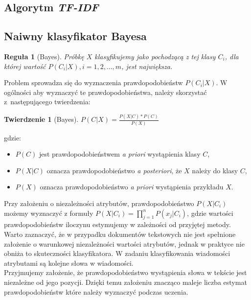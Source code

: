 \documentclass[a4paper,12pt]{article}
\newtheorem{rg}{Reguła}
\newtheorem{twr}{Twierdzenie}
\begin{document}
\subsection{Algorytm \textit{TF-IDF}}

\subsection{Naiwny klasyfikator Bayesa}
 
\begin{rg}[Bayes]
Próbkę $X$ klasyfikujemy jako pochodzącą z tej klasy $C_i$, dla której wartość $P(C_i|X), i = 1, 2, \dots, m$, jest największa.
\end{rg}
 
Problem sprowadza się do wyznaczenia prawdopodobieństw $P(C_i|X)$.
W ogólności aby wyznaczyć te prawdopodobieństwa, należy skorzystać z~następującego twierdzenia:

\begin{twr}[Bayes]
$P(C|X) = \frac{P(X|C)*P(C)}{P(X)}$
\end{twr}
 
gdzie:

\begin{itemize}
\item \textbf{$P(C)$} jest prawdopodobieństwem \textit{a priori} wystąpienia
klasy $C$,
\item \textbf{$P(X|C)$} oznacza prawdopodobieństwo \textit{a posteriori}, że
$X$ należy do klasy $C$,
\item \textbf{$P(X)$} oznacza prawdopodobieństwo \textit{a priori} wystąpienia przykładu $X$.
\end{itemize} 
 
Przy założeniu o niezależności atrybutów, prawdopodobieństwo $P(X|C_i)$ możemy wyznaczyć z formuły $P(X|C_i) = \prod\limits_{j=1}^n P(x_j|C_i)$, gdzie wartości prawdopodobieństw iloczynu estymujemy
w zależności od przyjętej metody.\\

Warto zaznaczyć, że w przypadku dokumentów tekstowych nie jest spełnione założenie o warunkowej niezależności wartości atrybutów, jednak w praktyce nie obniża to skuteczności klasyfikatora. W zadaniu klasyfikowania wiadomości atrybutami są kolejne słowa w wiadomości.\\

Przyjmujemy założenie, że prawdopodobieństwo wystąpienia słowa w tekście jest niezależne od jego pozycji. Dzięki temu założeniu znacząco maleje liczba estymat prawdopodobieństw które należy wyznaczyć podczas uczenia.\\
\end{document}
